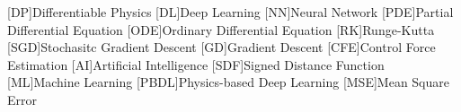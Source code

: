 [DP]{Differentiable Physics}
[DL]{Deep Learning}
[NN]{Neural Network}
[PDE]{Partial Differential Equation}
[ODE]{Ordinary Differential Equation}
[RK]{Runge-Kutta}
[SGD]{Stochasitc Gradient Descent}
[GD]{Gradient Descent}
[CFE]{Control Force Estimation}
[AI]{Artificial Intelligence}
[SDF]{Signed Distance Function}
[ML]{Machine Learning}
[PBDL]{Physics-based Deep Learning}
[MSE]{Mean Square Error}

